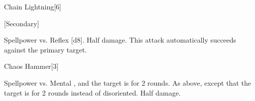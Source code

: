 \begin{spellsection}{Chain Lightning}[6]
    \begin{spellheader}
    \end{spellheader}
    \begin{spellcontent}
        \begin{spelltargetinginfo}
            [Secondary]
        \end{spelltargetinginfo}
        \begin{spelleffects}
            \begin{spellattack}{Spellpower vs. Reflex}
                \spellsuccess {}[d8].
                \spellfailure Half damage.
                \spellspecial This attack automatically succeeds against the primary target.
            \end{spellattack}
        \end{spelleffects}
    \end{spellcontent}
    \begin{spellfooter}
        \miscastexplode
    \end{spellfooter}
\end{spellsection}

\begin{spellsection}{Chaos Hammer}[3]
    \begin{spellheader}
    \end{spellheader}
    \begin{spellcontent}
        \begin{spelltargetinginfo}
        \end{spelltargetinginfo}
        \begin{spelleffects}
            \begin{spellattack}{Spellpower vs. Mental}
                \spellsuccess {}, and the target is \disoriented for 2 rounds.
                \spellcritical As above, except that the target is \confused for 2 rounds instead of disoriented.
                \spellfailure Half damage.
            \end{spellattack}
        \end{spelleffects}
    \end{spellcontent}
    \begin{spellfooter}
        \miscastrandom
    \end{spellfooter}
\end{spellsection}

